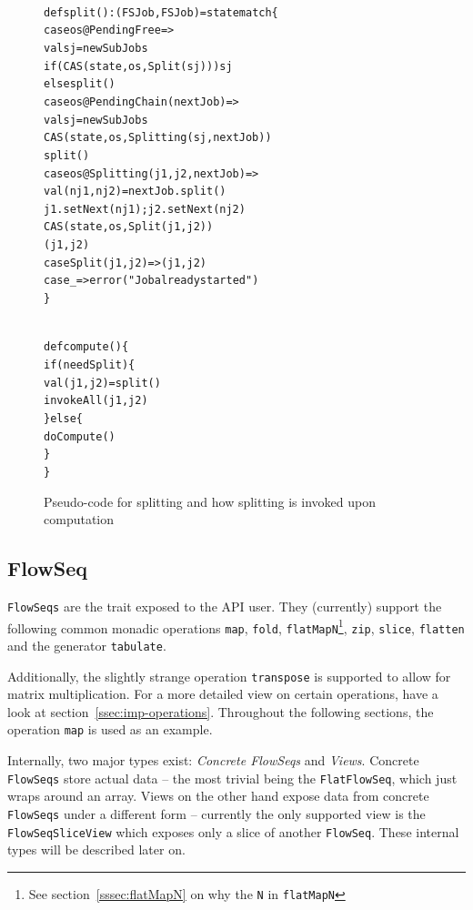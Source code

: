 \documentclass[runningheads,a4paper,fleqn]{llncs}
\begin{document}
\begin{figure}
\begin{minipage}[t]{7cm}
\begin{alltt}
{\scriptsize
def split(): (FSJob, FSJob) = state match \{
  case os@PendingFree =>
    val sj = newSubJobs
    if (CAS(state, os, Split(sj))) sj
    else split()
  case os@PendingChain(nextJob) =>
    val sj = newSubJobs
    CAS(state, os, Splitting(sj, nextJob))
    split()
  case os@Splitting(j1, j2, nextJob) =>
    val (nj1, nj2) = nextJob.split()
    j1.setNext(nj1); j2.setNext(nj2)
    CAS(state, os, Split(j1, j2))
    (j1, j2)
  case Split(j1, j2) => (j1, j2)
  case _ => error("Job already started")
\}
}
\end{alltt}
\end{minipage}
\begin{minipage}[t]{4cm}
\begin{alltt}
{\scriptsize
def compute() \{
  if (needSplit) \{
    val (j1, j2) = split()
    invokeAll(j1, j2)
  \} else \{
    doCompute()
  \}
\}
}
\end{alltt}
\end{minipage}
\caption{Pseudo-code for splitting and how splitting is invoked upon
  computation}
\label{fig:split-code}
\end{figure}

\subsection{FlowSeq}
\label{ssec:flowarray}
\texttt{FlowSeqs} are the trait exposed to the API user. They (currently)
support the following common monadic operations \texttt{map},
\texttt{fold}, \texttt{flatMapN}\footnote{See
  section~\ref{sssec:flatMapN} on why the \texttt{N} in
  \texttt{flatMapN}}, \texttt{zip}, \texttt{slice}, \texttt{flatten}
and the generator \texttt{tabulate}.

Additionally, the slightly strange operation \texttt{transpose} is
supported
to allow for matrix multiplication. For a more detailed view on 
certain operations, have a look at
section~\ref{ssec:imp-operations}. Throughout the following sections,
the operation \texttt{map} is used as an example.

Internally, two major types exist: \emph{Concrete FlowSeqs} and
\emph{Views}. Concrete \texttt{FlowSeqs} store actual data -- the most
trivial being the \texttt{FlatFlowSeq}, which just wraps around an
array. Views on the other hand expose data from
concrete \texttt{FlowSeqs} under a different form -- currently the
only supported view is the \texttt{FlowSeqSliceView} which exposes
only a slice of another \texttt{FlowSeq}. These internal types will be
described later on.
\end{document}
